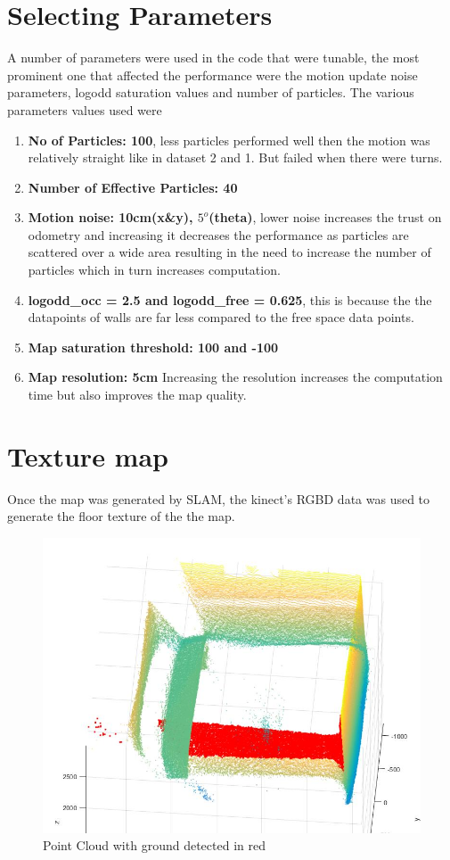 \documentclass[fleqn,10pt]{SelfArx} %
\begin{document}
\section{Selecting Parameters}
\label{sec:param}
A number of parameters were used in the code that were tunable, the most prominent one that affected the performance were the motion update noise parameters, logodd saturation values and number of particles. The various parameters values used were
\begin{enumerate}
\item \textbf{No of Particles: 100}, less particles performed well then the motion was relatively straight like in dataset 2 and 1. But failed when there were turns.
\item \textbf{Number of Effective Particles: 40}
\item \textbf{Motion noise: 10cm(x\&y), $5^o$(theta)}, lower noise increases the trust on odometry and increasing it decreases the performance as particles are scattered over a wide area resulting in the need to increase the number of particles which in turn increases computation.
\item \textbf{logodd\_occ = 2.5 and logodd\_free = 0.625}, this is because the the datapoints of walls are far less compared to the free space data points.
\item \textbf{Map saturation threshold: 100 and -100}
\item \textbf{Map resolution: 5cm} Increasing the resolution increases the computation time but also improves the map quality.
\end{enumerate}

\section{Texture map}
\label{sec:tm}
Once the map was generated by SLAM, the kinect's RGBD data was used to generate the floor texture of the the map.

\begin{figure}[htbp]
\centering
\includegraphics[scale=0.3]{pc.jpg}
\caption{Point Cloud with ground detected in red}
\label{fig:pc}
\end{figure}
\end{document}

